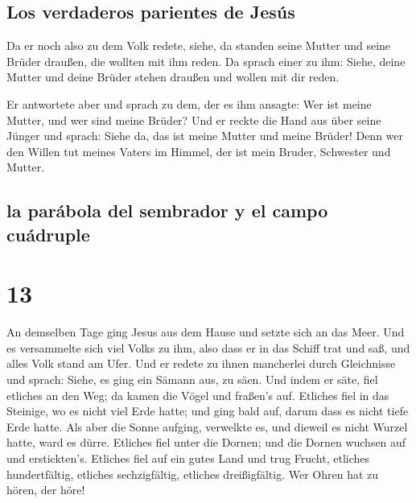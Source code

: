 \hypertarget{los-verdaderos-parientes-de-jesuxfas}{%
\subsection{Los verdaderos parientes de
Jesús}\label{los-verdaderos-parientes-de-jesuxfas}}

 Da er noch also zu dem Volk redete, siehe, da standen
seine Mutter und seine Brüder draußen, die wollten mit ihm reden.
 Da sprach einer zu ihm: Siehe, deine Mutter und deine
Brüder stehen draußen und wollen mit dir reden.

 Er antwortete aber und sprach zu dem, der es ihm
ansagte: Wer ist meine Mutter, und wer sind meine Brüder?
 Und er reckte die Hand aus über seine Jünger und sprach:
Siehe da, das ist meine Mutter und meine Brüder!  Denn
wer den Willen tut meines Vaters im Himmel, der ist mein Bruder,
Schwester und Mutter.

\hypertarget{la-paruxe1bola-del-sembrador-y-el-campo-cuuxe1druple}{%
\subsection{la parábola del sembrador y el campo
cuádruple}\label{la-paruxe1bola-del-sembrador-y-el-campo-cuuxe1druple}}

\hypertarget{section-12}{%
\section{13}\label{section-12}}

 An demselben Tage ging Jesus aus dem Hause und setzte
sich an das Meer.  Und es versammelte sich viel Volks zu
ihm, also dass er in das Schiff trat und saß, und alles Volk stand am
Ufer.  Und er redete zu ihnen mancherlei durch Gleichnisse
und sprach: Siehe, es ging ein Sämann aus, zu säen.  Und
indem er säte, fiel etliches an den Weg; da kamen die Vögel und fraßen's
auf.  Etliches fiel in das Steinige, wo es nicht viel Erde
hatte; und ging bald auf, darum dass es nicht tiefe Erde hatte.
 Als aber die Sonne aufging, verwelkte es, und dieweil es
nicht Wurzel hatte, ward es dürre.  Etliches fiel unter
die Dornen; und die Dornen wuchsen auf und erstickten's. 
Etliches fiel auf ein gutes Land und trug Frucht, etliches
hundertfältig, etliches sechzigfältig, etliches dreißigfältig.
 Wer Ohren hat zu hören, der höre!

